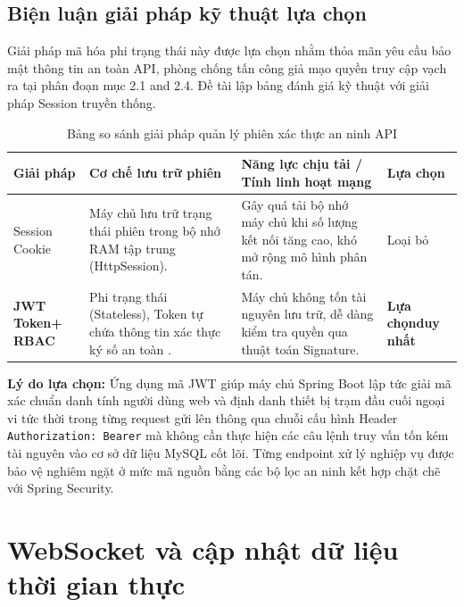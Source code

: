 \documentclass[../DoAn.tex]{subfiles}
\begin{document}
\subsection{Biện luận giải pháp kỹ thuật lựa chọn}

Giải pháp mã hóa phi trạng thái này được lựa chọn nhằm thỏa mãn yêu cầu bảo mật thông tin an toàn API, phòng chống tấn công giả mạo quyền truy cập vạch ra tại phân đoạn mục 2.1 and 2.4. Đề tài lập bảng đánh giá kỹ thuật với giải pháp Session truyền thống.

\begin{table}[ht!]
\centering
\small
\renewcommand{\arraystretch}{1.3}
\caption{Bảng so sánh giải pháp quản lý phiên xác thực an ninh API}
\label{tab:security_comparison}
\begin{tabular}{|>{\raggedright\arraybackslash}p{2.3cm}|>{\raggedright\arraybackslash}p{4.5cm}|>{\raggedright\arraybackslash}p{5.5cm}|>{\centering\arraybackslash}p{1.7cm}|}
\hline
\textbf{Giải pháp} & \textbf{Cơ chế lưu trữ phiên} & \textbf{Năng lực chịu tải / Tính linh hoạt mạng} & \textbf{Lựa chọn} \\ \hline
Session Cookie & Máy chủ lưu trữ trạng thái phiên trong bộ nhớ RAM tập trung (HttpSession). & Gây quá tải bộ nhớ máy chủ khi số lượng kết nối tăng cao, khó mở rộng mô hình phân tán. & Loại bỏ \\ \hline
\textbf{JWT Token\newline + RBAC} & Phi trạng thái (Stateless), Token tự chứa thông tin xác thực ký số an toàn \cite{rfc7519}. & Máy chủ không tốn tài nguyên lưu trữ, dễ dàng kiểm tra quyền qua thuật toán Signature. & \textbf{Lựa chọn\newline duy nhất} \\ \hline
\end{tabular}
\end{table}

\textbf{Lý do lựa chọn:} Ứng dụng mã JWT giúp máy chủ Spring Boot lập tức giải mã xác chuẩn danh tính người dùng web và định danh thiết bị trạm đầu cuối ngoại vi tức thời trong từng request gửi lên thông qua chuỗi cấu hình Header \texttt{Authorization: Bearer} mà không cần thực hiện các câu lệnh truy vấn tốn kém tài nguyên vào cơ sở dữ liệu MySQL cốt lõi. Từng endpoint xử lý nghiệp vụ được bảo vệ nghiêm ngặt ở mức mã nguồn bằng các bộ lọc an ninh kết hợp chặt chẽ với Spring Security.

\clearpage

\section{WebSocket và cập nhật dữ liệu thời gian thực}
\label{section:3.6}
\end{document}
